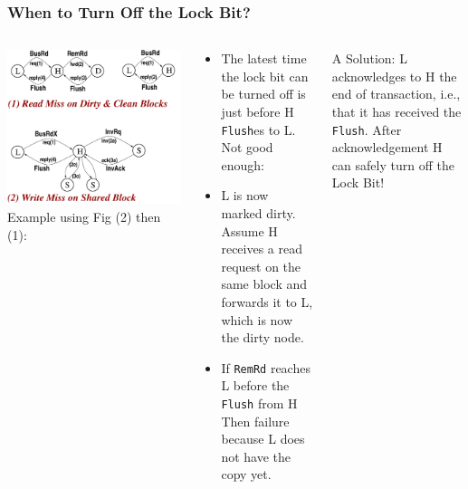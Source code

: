 \documentclass{beamer}
\renewcommand{\emph}[1]{\textcolor{structure}{#1}}
\newcommand{\emp}[1]{\textcolor{DikuRed}{ #1}}
\begin{document}
\begin{frame}[fragile,t]
\frametitle{When to Turn Off the Lock Bit?}

\begin{columns}
\includegraphics[width=45ex]{FigsInfCoherence/MSIccNUMA}
Example using Fig \emp{(2)} then \emp{(1)}:
\begin{scriptsize}
\begin{itemize}
    \item The latest time the lock bit can be turned off is
            just before H {\tt Flush}es to L. \alert{Not good enough:}\pause
    \item L is now marked dirty. Assume H receives a read request on 
            the same block and forwards it to L, which is now the 
            dirty node.
    \item If {\tt RemRd} reaches L before the {\tt Flush} from H Then \alert{failure}
            because L does not have the copy yet.  
\end  {itemize}
\end{scriptsize}
\bigskip
\emph{A Solution:} L acknowledges to H the end of transaction,
        i.e., that it has received the {\tt Flush}. After
        acknowledgement H can safely turn off the Lock Bit! 
\end{columns}

\end{frame}
\end{document}
